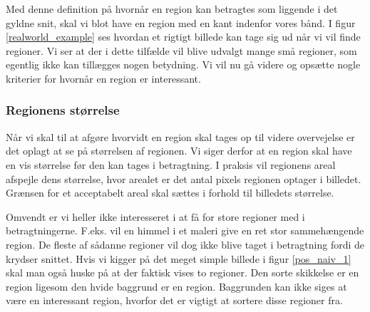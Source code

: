 {Med denne definition på hvornår en region kan betragtes som liggende i
det gyldne snit, skal vi blot have en region med en kant indenfor vores
bånd.  I figur \ref{realworld_example} ses hvordan et rigtigt billede
kan tage sig ud når vi vil finde regioner.  Vi ser at der i dette
tilfælde vil blive udvalgt mange små regioner, som egentlig ikke kan
tillægges nogen betydning.  Vi vil nu gå videre og opsætte nogle
kriterier for hvornår en region er interessant.

\subsubsection{Regionens størrelse}
Når vi skal til at afgøre hvorvidt en region skal tages op til videre
overvejelse er det oplagt at se på størrelsen af regionen.  Vi siger
derfor at en region skal have en vis størrelse før den kan tages i
betragtning.  I praksis vil regionens areal afspejle dens størrelse,
hvor arealet er det antal pixels regionen optager i billedet.  Grænsen
for et acceptabelt areal skal sættes i forhold til billedets størrelse.

Omvendt er vi heller ikke interesseret i at få for store regioner med i
betragtningerne.  F.eks. vil en himmel i et maleri give en ret stor
sammehængende region.  De fleste af sådanne regioner vil dog ikke blive
taget i betragtning fordi de krydser snittet.  Hvis vi kigger på det
meget simple billede i figur \ref{pos_naiv_1} skal man også huske på at
der faktisk vises to regioner. Den sorte skikkelse er en region ligesom
den hvide baggrund er en region.  Baggrunden kan ikke siges at være en
interessant region, hvorfor det er vigtigt at sortere disse regioner
fra.

}
